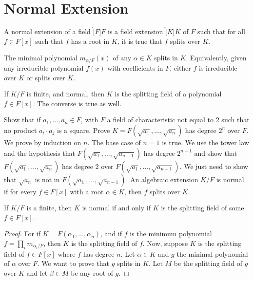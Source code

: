\documentclass{article}                                                        %
\begin{document}
    \section{Normal Extension}
        \begin{definition}
            A normal extension of a field $\ring[F]{F}$ is a field extension
            $\ring[K]{K}$ of $F$ such that for all $f\in{F}[x]$ such that $f$
            has a root in $K$, it is true that $f$ splits over $K$.
        \end{definition}
        \begin{theorem}
            The minimal polynomial $m_{\alpha/F}(x)$ of any $\alpha\in{K}$
            splits in $K$. Equivalently, given any irreducible polynomial
            $f(x)$ with coefficients in $F$, either $f$ is irreducible over $K$
            or splits over $K$.
        \end{theorem}
        \begin{theorem}
            If $K/F$ is finite, and normal, then $K$ is the splitting field of
            a polynomial $f\in{F}[x]$. The converse is true as well.
        \end{theorem}
        Show that if $a_{1},\dots,a_{n}\in{F}$, with $F$ a field of
        characteristic not equal to 2 such that no product $a_{i}\cdot{a}_{j}$
        is a square. Prove $K=F(\sqrt{a_{1}},\dots,\sqrt{a_{n}})$ has degree
        $2^{n}$ over $F$. We prove by induction on $n$. The base case of $n=1$
        is true. We use the tower law and the hypothesis that
        $F(\sqrt{a_{1}},\dots,\sqrt{a_{n-1}})$ has degree $2^{n-1}$ and show
        that $F(\sqrt{a_{1}},\dots,\sqrt{a_{n}})$ has degree 2 over
        $F(\sqrt{a_{1}},\dots,\sqrt{a_{n-1}})$. We just need to show that
        $\sqrt{a_{n}}$ is not in $F(\sqrt{a_{1}},\dots,\sqrt{a_{n-1}})$.
        An algebraic extension $K/F$ is normal if for every $f\in{F}[x]$ with a
        root $\alpha\in{K}$, then $f$ splits over $K$.
        \begin{theorem}
            If $K/F$ is a finite, then $K$ is normal if and only if $K$ is the
            splitting field of some $f\in{F}[x]$.
        \end{theorem}
        \begin{proof}
            For if $K=F(\alpha_{1},\dots,\alpha_{n})$, and if $f$ is the
            minimum polynomial $f=\prod_{i}m_{\alpha_{i}/F}$, then $K$ is the
            splitting field of $f$. Now, suppose $K$ is the splitting field of
            $f\in{F}[x]$ where $f$ has degree $n$. Let $\alpha\in{K}$ and $g$
            the minimal polynomial of $\alpha$ over $F$. We want to prove that
            $g$ splits in $K$. Let $M$ be the splitting field of $g$ over $K$
            and let $\beta\in{M}$ be any root of $g$.
        \end{proof}
\end{document}
